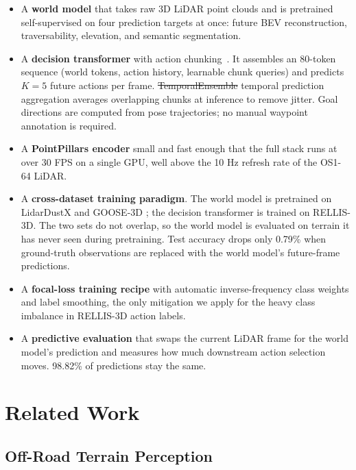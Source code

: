 \documentclass[sensors,article,submit,pdftex,moreauthors]{Definitions/mdpi}
\makeatletter
\providecommand{\DIFadd}[1]{{\protect\color{red}#1}} %
\providecommand{\DIFdel}[1]{{\protect\color{red}\sout{#1}}} %
\providecommand{\DIFaddbegin}{} %
\providecommand{\DIFaddend}{} %
\providecommand{\DIFdelbegin}{} %
\providecommand{\DIFdelend}{} %
\providecommand{\DIFscaledelfig}{0.5}
\newlength{\DIFdelgraphicswidth} %
\newlength{\DIFdelgraphicsheight} %
\providecommand{\DIFaddincludegraphics}[2][]{{\color{blue}\fbox{\DIFOincludegraphics[#1]{#2}}}} %
\providecommand{\DIFdelincludegraphics}[2][]{%
\sbox{\DIFdelgraphicsbox}{\DIFOincludegraphics[#1]{#2}}%
\settoboxwidth{\DIFdelgraphicswidth}{\DIFdelgraphicsbox} %
\settoboxtotalheight{\DIFdelgraphicsheight}{\DIFdelgraphicsbox} %
\scalebox{\DIFscaledelfig}{%
\parbox[b]{\DIFdelgraphicswidth}{\usebox{\DIFdelgraphicsbox}\\[-\baselineskip] \rule{\DIFdelgraphicswidth}{0em}}\llap{\resizebox{\DIFdelgraphicswidth}{\DIFdelgraphicsheight}{%
\setlength{\unitlength}{\DIFdelgraphicswidth}%
\begin{picture}(1,1)%
\thicklines\linethickness{2pt} %
{\color[rgb]{1,0,0}\put(0,0){\framebox(1,1){}}}%
{\color[rgb]{1,0,0}\put(0,0){\line( 1,1){1}}}%
{\color[rgb]{1,0,0}\put(0,1){\line(1,-1){1}}}%
\end{picture}%
}\hspace*{3pt}}} %
} %
\DeclareRobustCommand{\DIFaddbegin}{\DIFOaddbegin \let\includegraphics\DIFaddincludegraphics} %
\DeclareRobustCommand{\DIFaddend}{\DIFOaddend \let\includegraphics\DIFOincludegraphics} %
\DeclareRobustCommand{\DIFdelbegin}{\DIFOdelbegin \let\includegraphics\DIFdelincludegraphics} %
\DeclareRobustCommand{\DIFdelend}{\DIFOaddend \let\includegraphics\DIFOincludegraphics} %
\let\sout@orig\sout %
\renewcommand{\sout}[1]{\ifmmode\text{\sout@orig{\ensuremath{#1}}}\else\sout@orig{#1}\fi} %
\makeatother
\begin{document}
\begin{itemize}
    \item A \textbf{world model} that takes raw 3D LiDAR point clouds and is pretrained self-supervised on four prediction targets at once: future BEV reconstruction, traversability, elevation, and semantic segmentation.
    \item A \textbf{decision transformer} with action chunking~\cite{zhao2023act}. It assembles an 80-token sequence (world tokens, action history, learnable chunk queries) and predicts $K{=}5$ future actions per frame. \DIFdelbegin \DIFdel{TemporalEnsemble }\DIFdelend \DIFaddbegin \DIFadd{temporal prediction aggregation }\DIFaddend averages overlapping chunks at inference to remove jitter. Goal directions are computed from pose trajectories; no manual waypoint annotation is required.
    \item A \textbf{PointPillars encoder} small and fast enough that the full stack runs at over 30 FPS on a single GPU, well above the 10 Hz refresh rate of the OS1-64 LiDAR.
    \item A \textbf{cross-dataset training paradigm}. The world model is pretrained on LidarDustX \cite{lidardust} and GOOSE-3D \cite{goose2024}; the decision transformer is trained on RELLIS-3D. The two sets do not overlap, so the world model is evaluated on terrain it has never seen during pretraining. Test accuracy drops only 0.79\% when ground-truth observations are replaced with the world model's future-frame predictions.
    \item A \textbf{focal-loss training recipe} with automatic inverse-frequency class weights and label smoothing, the only mitigation we apply for the heavy class imbalance in RELLIS-3D action labels.
    \item A \textbf{predictive evaluation} that swaps the current LiDAR frame for the world model's prediction and measures how much downstream action selection moves. 98.82\% of predictions stay the same.
\end{itemize}

\section{Related Work}
\label{sec:related_work}

\subsection{Off-Road Terrain Perception}
\end{document}
